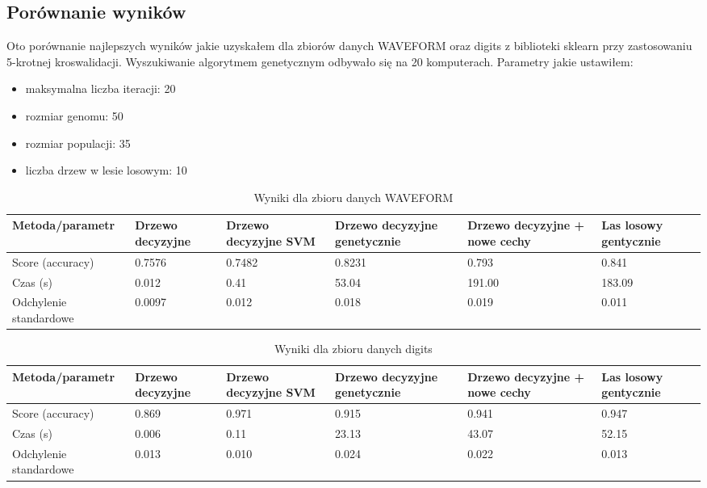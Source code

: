 \documentclass[magisterska]{pracamgr}
\theoremstyle{plain}
\theoremstyle{definition}
\theoremstyle{remark}
\begin{document}
\subsection{Porównanie wyników}
Oto porównanie najlepszych wyników jakie uzyskałem dla zbiorów danych WAVEFORM oraz digits z biblioteki sklearn
przy zastosowaniu 5-krotnej kroswalidacji.
Wyszukiwanie algorytmem genetycznym odbywało się na 20 komputerach. Parametry jakie ustawiłem:
\begin{itemize}
 \item maksymalna liczba iteracji: 20
 \item rozmiar genomu: 50
 \item rozmiar populacji: 35
 \item liczba drzew w lesie losowym: 10
\end{itemize}

\begin{table}\label{tab:res_wav}
\caption{Wyniki dla zbioru danych WAVEFORM}
 \begin{tabular}{l || P{2cm} | P{2cm} | P{2cm} | P{2cm} | P{2cm}}
  Metoda/parametr     & Drzewo decyzyjne & Drzewo decyzyjne SVM & Drzewo decyzyjne genetycznie & Drzewo decyzyjne + nowe cechy & Las losowy gentycznie\\ 
  \hline
  Score (accuracy) & 0.7576     & 0.7482     & 0.8231 & 0.793 & 0.841\\
  \hline
  Czas (s) & 0.012     & 0.41      & 53.04    & 191.00 & 183.09 \\
  \hline
  Odchylenie standardowe & 0.0097     & 0.012      & 0.018    & 0.019 & 0.011 \\
 \end{tabular}
\end{table}

\begin{table}\label{tab:res_dig}
\caption{Wyniki dla zbioru danych digits}
 \begin{tabular}{l || P{2cm} | P{2cm} | P{2cm} | P{2cm} | P{2cm}}
  Metoda/parametr     & Drzewo decyzyjne & Drzewo decyzyjne SVM & Drzewo decyzyjne genetycznie & Drzewo decyzyjne + nowe cechy & Las losowy gentycznie\\ 
  \hline
  Score (accuracy) & 0.869     & 0.971     & 0.915 & 0.941 & 0.947 \\
  \hline
  Czas (s) & 0.006     & 0.11      & 23.13    & 43.07 & 52.15 \\
  \hline
  Odchylenie standardowe & 0.013     & 0.010      & 0.024   & 0.022 & 0.013 \\
 \end{tabular}
\end{table}
\end{document}
